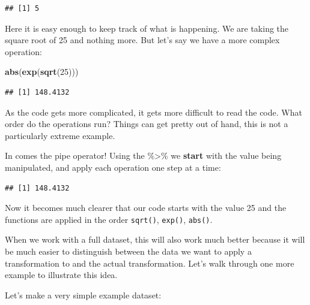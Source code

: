 \documentclass[
]{book}
\newenvironment{Shaded}{\begin{snugshade}}{\end{snugshade}}
\newcommand{\DecValTok}[1]{\textcolor[rgb]{0.00,0.00,0.81}{#1}}
\newcommand{\KeywordTok}[1]{\textcolor[rgb]{0.13,0.29,0.53}{\textbf{#1}}}
\newcommand{\NormalTok}[1]{#1}
\newcommand{\OperatorTok}[1]{\textcolor[rgb]{0.81,0.36,0.00}{\textbf{#1}}}
\newcommand{\StringTok}[1]{\textcolor[rgb]{0.31,0.60,0.02}{#1}}
\begin{document}
\begin{verbatim}
## [1] 5
\end{verbatim}

Here it is easy enough to keep track of what is happening. We are taking the square root of 25 and nothing more. But let's say we have a more complex operation:

\begin{Shaded}
\begin{Highlighting}[]
\KeywordTok{abs}\NormalTok{(}\KeywordTok{exp}\NormalTok{(}\KeywordTok{sqrt}\NormalTok{(}\DecValTok{25}\NormalTok{)))}
\end{Highlighting}
\end{Shaded}

\begin{verbatim}
## [1] 148.4132
\end{verbatim}

As the code gets more complicated, it gets more difficult to read the code. What order do the operations run? Things can get pretty out of hand, this is not a particularly extreme example.

In comes the pipe operator! Using the \%\textgreater\% we \textbf{start} with the value being manipulated, and apply each operation one step at a time:

\begin{Shaded}
\end{Shaded}

\begin{verbatim}
## [1] 148.4132
\end{verbatim}

Now it becomes much clearer that our code starts with the value 25 and the functions are applied in the order \texttt{sqrt()}, \texttt{exp()}, \texttt{abs()}.

When we work with a full dataset, this will also work much better because it will be much easier to distinguish between the data we want to apply a transformation to and the actual transformation. Let's walk through one more example to illustrate this idea.

Let's make a very simple example dataset:
\end{document}

